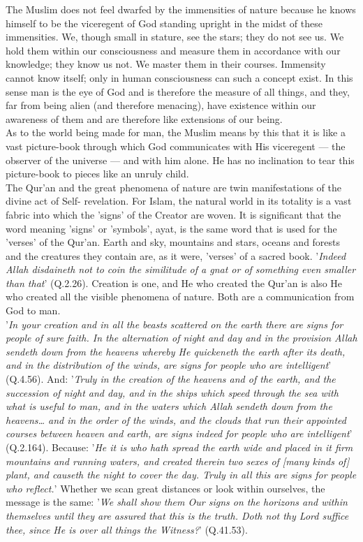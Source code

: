 \documentclass[11pt, b5paper, twoside]{book}
\begin{document}
The Muslim does not feel dwarfed by the immensities of nature because he knows himself to be the 
viceregent of God standing upright in the midst of these immensities. We, though small in stature, 
see the stars; they do not see us. We hold them within our consciousness and measure them in 
accordance with our knowledge; they know us not. We master them in their courses. Immensity cannot 
know itself; only in human consciousness can such a concept exist. In this sense man is the eye of 
God and is therefore the measure of all things, and they, far from being alien (and therefore 
menacing), have existence within our awareness of them and are therefore like extensions of our 
being. \\

As to the world being made for man, the Muslim means by this that it is like a vast picture-book 
through which God communicates with His viceregent --- the observer of the universe --- and with him 
alone. He has no inclination to tear this picture-book to pieces like an unruly child. \\

The Qur'an and the great phenomena of nature are twin manifestations of the divine act of Self-
revelation. For Islam, the natural world in its totality is a vast fabric into which the 'signs' of 
the Creator are woven. It is significant that the word meaning 'signs' or 'symbols', ayat, is the 
same word that is used for the 'verses' of the Qur'an. Earth and sky, mountains and stars, oceans and 
forests and the creatures they contain are, as it were, 'verses' of a sacred book. '\emph{Indeed Allah 
disdaineth not to coin the similitude of a gnat or of something even smaller than that}' (Q.2.26). 
Creation is one, and He who created the Qur'an is also He who created all the visible phenomena of 
nature. Both are a communication from God to man. \\

'\emph{In your creation and in all the beasts scattered on the earth there are signs for people of sure 
faith. In the alternation of night and day and in the provision Allah sendeth down from the heavens 
whereby He quickeneth the earth after its death, and in the distribution of the winds, are signs for 
people who are intelligent}' (Q.4.56). And: '\emph{Truly in the creation of the heavens and of the earth, 
and the succession of night and day, and in the ships which speed through the sea with what is useful 
to man, and in the waters which Allah sendeth down from the heavens\ldots{} and in the order of the 
winds, and the clouds that run their appointed courses between heaven and earth, are signs indeed for 
people who are intelligent}' (Q.2.164). Because: '\emph{He it is who hath spread the earth wide and placed in it firm mountains and running waters, and created therein two sexes of [many kinds of] plant, and causeth the night to cover the day. Truly in all this are signs for people who reflect.}' Whether we 
scan great distances or look within ourselves, the message is the same: '\emph{We shall show them Our signs on the horizons and within themselves until they are assured that this is the truth. Doth not thy 
Lord suffice thee, since He is over all things the Witness?}' (Q.41.53). 
\end{document}
